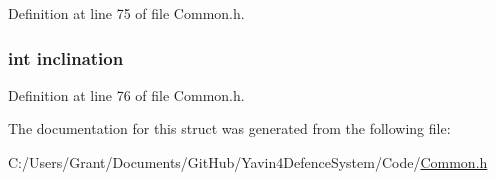 Definition at line 75 of file Common.\+h.

\hypertarget{struct_direction_af308b9934394c8bcf7614eb1df2d863f}{
\subsubsection[{inclination}]{\setlength{\rightskip}{0pt plus 5cm}int inclination}}\label{struct_direction_af308b9934394c8bcf7614eb1df2d863f}


Definition at line 76 of file Common.\+h.



The documentation for this struct was generated from the following file\+:\begin{DoxyCompactItemize}
\item 
C\+:/\+Users/\+Grant/\+Documents/\+Git\+Hub/\+Yavin4\+Defence\+System/\+Code/\hyperlink{_common_8h}{Common.\+h}\end{DoxyCompactItemize}
